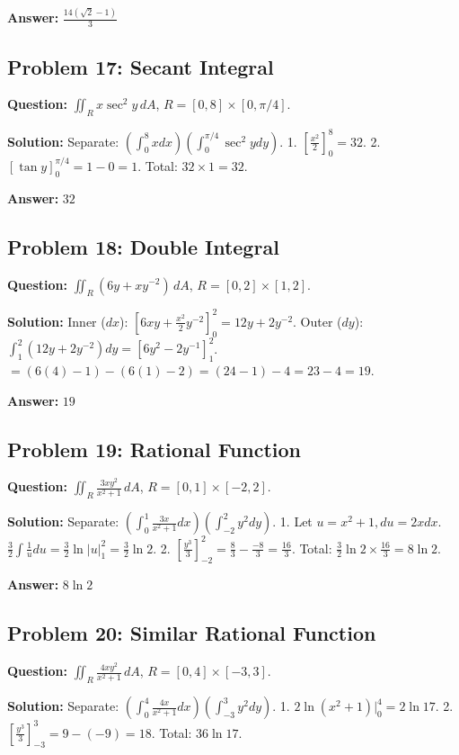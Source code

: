 \documentclass[11pt,a4paper]{article}
\begin{document}
\textbf{Answer:} $\frac{14(\sqrt{2}-1)}{3}$

\subsection*{Problem 17: Secant Integral}
\textbf{Question:} $\iint_R x \sec^2 y \, dA$, $R = [0,8] \times [0, \pi/4]$.

\textbf{Solution:}
Separate: $(\int_0^8 x dx)(\int_0^{\pi/4} \sec^2 y dy)$.
1. $[\frac{x^2}{2}]_0^8 = 32$.
2. $[\tan y]_0^{\pi/4} = 1 - 0 = 1$.
Total: $32 \times 1 = 32$.

\textbf{Answer:} $32$

\subsection*{Problem 18: Double Integral}
\textbf{Question:} $\iint_R (6y + xy^{-2}) \, dA$, $R = [0,2] \times [1,2]$.

\textbf{Solution:}
Inner ($dx$): $[6xy + \frac{x^2}{2}y^{-2}]_0^2 = 12y + 2y^{-2}$.
Outer ($dy$): $\int_1^2 (12y + 2y^{-2}) dy = [6y^2 - 2y^{-1}]_1^2$.
$= (6(4) - 1) - (6(1) - 2) = (24-1) - 4 = 23 - 4 = 19$.

\textbf{Answer:} $19$

\subsection*{Problem 19: Rational Function}
\textbf{Question:} $\iint_R \frac{3xy^2}{x^2+1} \, dA$, $R = [0,1] \times [-2,2]$.

\textbf{Solution:}
Separate: $(\int_0^1 \frac{3x}{x^2+1} dx)(\int_{-2}^2 y^2 dy)$.
1. Let $u=x^2+1, du=2x dx$. $\frac{3}{2} \int \frac{1}{u} du = \frac{3}{2} \ln|u|_1^2 = \frac{3}{2} \ln 2$.
2. $[\frac{y^3}{3}]_{-2}^2 = \frac{8}{3} - \frac{-8}{3} = \frac{16}{3}$.
Total: $\frac{3}{2} \ln 2 \times \frac{16}{3} = 8 \ln 2$.

\textbf{Answer:} $8 \ln 2$

\subsection*{Problem 20: Similar Rational Function}
\textbf{Question:} $\iint_R \frac{4xy^2}{x^2+1} \, dA$, $R = [0,4] \times [-3,3]$.

\textbf{Solution:}
Separate: $(\int_0^4 \frac{4x}{x^2+1} dx)(\int_{-3}^3 y^2 dy)$.
1. $2 \ln(x^2+1)|_0^4 = 2 \ln 17$.
2. $[\frac{y^3}{3}]_{-3}^3 = 9 - (-9) = 18$.
Total: $36 \ln 17$.
\end{document}
